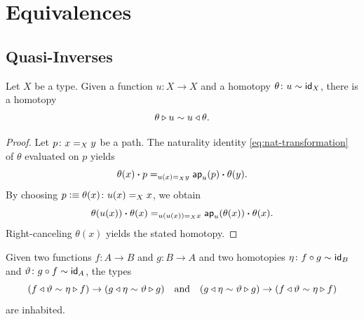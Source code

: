 \chapter{Equivalences}

\section{Quasi-Inverses}

\begin{lem}\label{lem:X->X-id-homotopy}
    Let\/ $X$ be a type. Given a function\/ $u\colon X\to X$ and a homotopy\/ $\theta\colon u\sim\id_X$, there is a homotopy
    \[
        \theta\triangleright u\sim u\triangleleft\theta.
    \]
\end{lem}

\begin{proof}
    Let $p\colon x\eq Xy$ be a path. The naturality identity \eqref{eq:nat-transformation} of $\theta$ evaluated on $p$ yields
    \[
        \theta(x)\mathbin{\boldsymbol{\cdot}} p\mathrel{=_{u(x)\mathrel{=_{X}}y}}\mathsf{ap}_u(p)\mathbin{\boldsymbol{\cdot}}\theta(y).
    \]
    By choosing $p\defeq\theta(x)\colon u(x)\eq Xx$, we obtain
    \[
        \theta(u(x))\mathbin{\boldsymbol{\cdot}}\theta(x)
        \mathrel{=_{u(u(x))\mathrel{=_{X}}x}}
        \mathsf{ap}_u(\theta(x))\mathbin{\boldsymbol{\cdot}}\theta(x).
    \]
    Right-canceling $\theta(x)$ yields the stated homotopy.
\end{proof}

\begin{prop}\label{prop:coherence-swap}
    Given two functions\/ $f\colon A\to B$ and\/ $g\colon B\to A$ and two homotopies\/ $\eta\colon f\circ g\sim\id_B$ and\/ $\vartheta\colon g\circ f\sim\id_A$, the types
    \[
        (f\triangleleft\vartheta\sim\eta\triangleright f)
            \to(g\triangleleft\eta\sim\vartheta\triangleright g)
        \quad\text{and\/}\quad
        (g\triangleleft\eta\sim\vartheta\triangleright g)
            \to(f\triangleleft\vartheta\sim\eta\triangleright f)
    \]
    are inhabited.
\end{prop}

